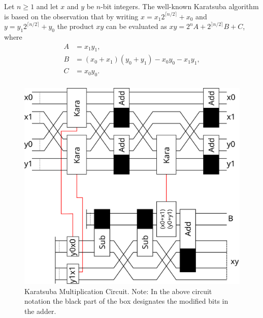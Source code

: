    Let $n\geq 1$ and let $x$ and $y$ be $n$-bit integers.
    The well-known Karatsuba\cite{KO:1963} algorithm is based on the observation that by writing $x=x_1 2^{\lceil n/2\rceil}+x_0$ and $y=y_1 2^{\lceil n/2\rceil }+y_0$ the product $xy$ can be evaluated as $xy=2^n A + 2^{\rceil n/2 \rceil} B + C$, where
    \begin{align*}
      A &= x_1 y_1, \\
      B &= (x_0+x_1)(y_0+y_1) - x_0 y_0 - x_1 y_1,\\
      C &= x_0 y_0. \\
    \end{align*}
    \begin{figure}[ht]
      \capstart
      \centering
      \includegraphics[width=2\textwidth/3]{images/karatsuba2}
      \caption{Karatsuba Multiplication Circuit.
               Note: In the above circuit notation the black part of the box designates the modified bits in the adder.}
      \label{fig:kara2}
     \end{figure}
